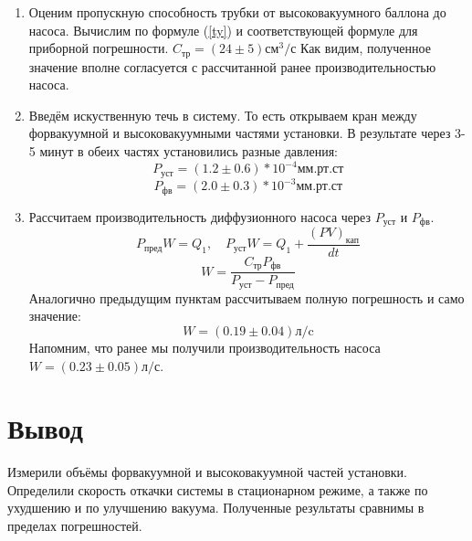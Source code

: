\documentclass[a4paper,12pt]{article}
\begin{document}
\begin{enumerate}
    \item Оценим пропускную способность трубки от высоковакуумного баллона до насоса.
        Вычислим по формуле (\ref{ty}) и соответствующей формуле для приборной погрешности.
        $C_{\text{тр}} = (24 \pm 5) \text{см}^3/\text{с}$
        Как видим, полученное значение вполне согласуется с рассчитанной ранее производительностью насоса.
    \item Введём искуственную течь в систему.
        То есть открываем кран между форвакуумной и высоковакуумными частями установки.
        В результате через 3-5 минут в обеих частях установились разные давления:
        $$    P_{\text{уст}} = (1.2 \pm 0.6)*10^{-4} \text{мм.рт.ст}$$
        $$    P_{\text{фв}}  = (2.0 \pm 0.3)*10^{-3} \text{мм.рт.ст} $$
    \item Рассчитаем производительность диффузионного насоса через $P_{уст}$ и $P_{фв}$.
	    $$P_{\text{пред}}W = Q_1, \quad P_{\text{уст}}W = Q_1 + \frac{(PV)_{\text{кап}}}{dt}$$
        $$W = \frac{C_{\text{тр}} P_{\text{фв}}}{ P_{\text{уст}} - P_{\text{пред}}}$$
        Аналогично предыдущим пунктам рассчитываем полную погрешность и само значение:
        $$W = (0.19 \pm 0.04) \text{л/c}$$
       Напомним, что ранее мы получили производительность насоса $W = (0.23 \pm 0.05) \text{л/с}$.
    \end{enumerate}

\section{Вывод}

    Измерили объёмы форвакуумной и высоковакуумной частей установки. Определили скорость откачки системы в стационарном режиме, а также по ухудшению и по улучшению вакуума. Полученные результаты сравнимы в пределах погрешностей.
\end{document}

